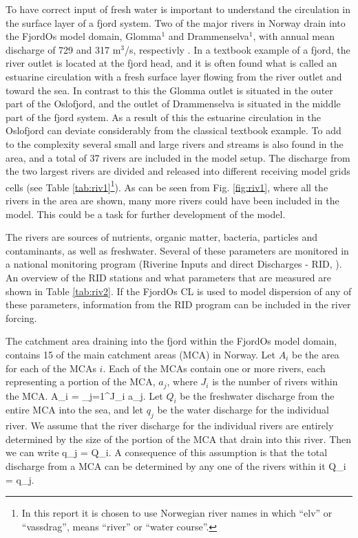 To have correct input of fresh water is important to understand the circulation in the surface layer of a fjord system. Two of the major rivers in Norway drain into the FjordOs model domain, Glomma$^1$ and Drammenselva$^1$, with annual mean discharge of 729 and 317 m$^3$/s, respectivly \citep{milli:etal:2011}. 
In a textbook example of a fjord, the river outlet is located at the fjord head, and it is often found what is called an estuarine circulation with a fresh surface layer flowing from the river outlet and toward the sea. In contrast to this the Glomma outlet is situated in the outer part of the Oslofjord,
and the outlet of Drammenselva is situated in the middle part of the fjord system. As a result of this the estuarine circulation in the Oslofjord can deviate considerably from the classical textbook example. 
To add to the complexity several small and large rivers and streams is also found in the area, and a total of 37 rivers are included in the model setup. The discharge from the two largest rivers are divided and released into different receiving model grids cells (see Table \ref{tab:riv1}\footnote{In this report it is chosen to use Norwegian river names in which ``elv'' or ``vassdrag'', means ``river'' or ``water course''.}). As can be seen from Fig. \ref{fig:riv1}, where all the rivers in the area are shown, many more rivers could have been included in the model. This could be a task for further development of the model.
%
%

The rivers are sources of nutrients, organic matter, bacteria, particles and contaminants, as well as freshwater. Several of these parameters are monitored in a national monitoring program (Riverine Inputs and direct Discharges - RID, \cite{skarb:etal:2011}). An overview of the RID stations and what parameters that are measured are shown in Table \ref{tab:riv2}. If the FjordOs CL is used to model dispersion of any of these parameters, information from the RID program can be included in the river forcing.
%

The catchment area draining into the fjord within the FjordOs model domain, contains 15 of the main catchment areas (MCA) in Norway. Let $A_i$ be the area for each of the MCAs $i$. Each of the MCAs contain one or more rivers, each representing a portion of the MCA, $a_j$, where $J_i$ is the number of rivers within the MCA. 
\be
  \label{eq:riv01}
   A_i = \sum_{j=1}^{J_i} a_j.
\ee
Let $Q_i$ be the freshwater discharge from the entire MCA into the sea, and let $q_j$ be the water discharge for the individual river. We assume that the river discharge for the individual rivers are entirely determined by the size of the portion of the MCA that drain into this river. Then we can write 
\be
 \label{eq:riv02}
  q_j =  Q_i.
\ee
A consequence of this assumption is that the total discharge from a MCA can be determined by any one of the rivers within it 
\be
 \label{eq:riv03}
 Q_i =  q_j.
\ee

